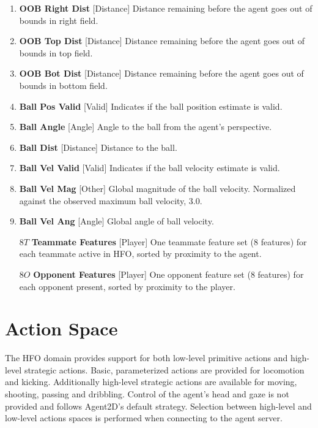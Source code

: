 \documentclass[12pt]{article}
\def\itemrange#1{%
\addtocounter{enumi}{1}%
\edef\labelenumi{\theenumi--\noexpand\theenumi}%
\addtocounter{enumi}{-1}%
\addtocounter{enumi}{#1}%
\item
\def\labelenumi{\theenumi}}
\renewcommand*{\labelenumi}{\theenumi}
\begin{document}
\begin{enumerate}
{    point of the left side of the HFO playable area. E.g. distance
    remaining before the agent goes out of bounds in left field.}
  \item{\textbf{OOB Right Dist} [Distance] Distance remaining before
    the agent goes out of bounds in right field.}
  \item{\textbf{OOB Top Dist} [Distance] Distance remaining before
    the agent goes out of bounds in top field.}
  \item{\textbf{OOB Bot Dist} [Distance] Distance remaining before
    the agent goes out of bounds in bottom field.}
  \item{\textbf{Ball Pos Valid} [Valid] Indicates if the ball position estimate is valid.}
  \itemrange{1}{\textbf{Ball Angle} [Angle] Angle to the ball from the agent's perspective.}
  \item{\textbf{Ball Dist} [Distance] Distance to the ball.}
  \item{\textbf{Ball Vel Valid} [Valid] Indicates if the ball velocity estimate is valid.}
  \item{\textbf{Ball Vel Mag} [Other] Global magnitude of the ball velocity. Normalized against the observed maximum ball velocity, 3.0.}
  \itemrange{1}{\textbf{Ball Vel Ang} [Angle] Global angle of ball velocity.}
  \item [$8T$] {\textbf{Teammate Features} [Player] One teammate feature set (8 features) for each teammate active in HFO, sorted by proximity to the agent.}
  \item [$8O$] {\textbf{Opponent Features} [Player] One opponent feature set (8 features) for each opponent present, sorted by proximity to the player.}
\end{enumerate}

\section{Action Space}
The HFO domain provides support for both low-level primitive actions
and high-level strategic actions. Basic, parameterized actions are
provided for locomotion and kicking. Additionally high-level strategic
actions are available for moving, shooting, passing and
dribbling. Control of the agent's head and gaze is not provided and
follows Agent2D's default strategy. Selection between high-level and
low-level actions spaces is performed when connecting to the agent
server.
\end{document}
